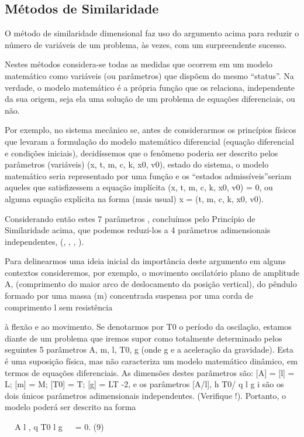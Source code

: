 \subsection{Métodos de Similaridade}

O método de similaridade dimensional faz uso do argumento acima para reduzir o número de variáveis de um problema, às vezes, com um surpreendente sucesso.

Nestes métodos considera-se todas as medidas que ocorrem em um modelo matemático como variáveis (ou parâmetros) que dispõem do mesmo “status”. Na verdade, o modelo matemático é a própria função que os relaciona, independente da sua origem, seja ela uma solução de um problema de equações diferenciais, ou não.

Por exemplo, no sistema mecânico se, antes de considerarmos os princípios físicos que levaram a formulação do modelo matemático diferencial (equação diferencial e condições iniciais), decidíssemos que o fenômeno poderia ser descrito pelos parâmetros (variáveis) (x, t, m, c, k, x0, v0), estado do sistema, o modelo matemático seria representado por uma função \Phi e os “estados admissíveis”seriam aqueles que satisfizessem a equação implícita \Phi(x, t, m, c, k, x0, v0) = 0, ou alguma equação explícita na forma (mais usual)
x = \Phi(t, m, c, k, x0, v0).

Considerando então estes 7 parâmetros , concluímos pelo Princípio de Similaridade acima, que podemos reduzi-los a 4 parâmetros adimensionais independentes, (\eta, \tau, , \mu).

Para delinearmos uma ideia inicial da importância deste argumento em alguns contextos consideremos, por exemplo, o movimento oscilatório plano de amplitude A, (comprimento do maior arco de deslocamento da posição vertical), do pêndulo formado por uma massa (m) concentrada suspensa por uma corda de comprimento l sem resistência

à flexão e ao movimento. Se denotarmos por T0 o período da oscilação, estamos diante de um problema que iremos supor como totalmente determinado pelos seguintes 5 parâmetros A, m, l, T0, g (onde g e a aceleração da gravidade). Esta é uma suposição física, mas não caracteriza um modelo matemático dinâmico, em termos de equações diferenciais. As dimensões destes parâmetros são: [A] = [l] = L; [m] = M; [T0] = T; [g] = LT -2, e os parâmetros [A/l], h T0/
q l
g
i
são os dois únicos parâmetros adimensionais independentes. (Verifique !). Portanto, o modelo poderá ser descrito na forma

\Phi


A
l
, q
T0
l
g

 = 0. (9)

